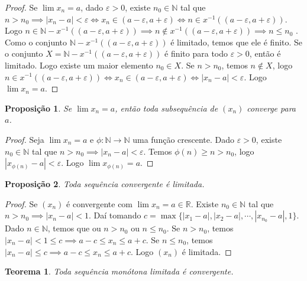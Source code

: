 \documentclass{article}
\newtheorem{prop}{Proposição}[section]
\theoremstyle{theorem}
\newtheorem{teo}{Teorema}
\theoremstyle{lemma}
\theoremstyle{definition}
\theoremstyle{remark}
\begin{document}
\begin{proof}
	Se $\lim x_n = a$, dado $\varepsilon >0$, existe $n_0 \in \mathbb{N}$ tal que $n > n_0 \implies |x_n - a| < \varepsilon \iff x_n \in (a-\varepsilon, a+\varepsilon) \iff n \in x^{-1}((a-\varepsilon, a+\varepsilon))$. Logo $n \in \mathbb{N} - x^{-1}( (a-\varepsilon, a+\varepsilon)) \implies n \not \in x^{-1}( (a-\varepsilon, a+\varepsilon)) \implies n \leq n_0$ .  Como o conjunto $\mathbb{N} - x^{-1}( (a - \varepsilon, a+\varepsilon))$ é limitado, temos que ele é finito.
	Se o conjunto $ X = \mathbb{N} - x^{-1}( (a - \varepsilon, a+\varepsilon))$ é finito para todo $\varepsilon >0$, então é limitado.  Logo existe um maior elemento $n_0 \in  X$. Se $n > n_0$,  temos $n \not \in X$, logo $n \in x^{-1}((a-\varepsilon, a+\varepsilon)) \iff x_n \in (a-\varepsilon, a+\varepsilon) \iff |x_n -a| < \varepsilon$. Logo $\lim x_n = a$.
\end{proof}
\begin{prop}
	Se $\lim x_n = a$, então toda subsequência de $(x_n)$ converge para $a$.
\end{prop}
\begin{proof}
	Seja $\lim x_n = a$ e $\phi: \mathbb{N} \to \mathbb{N}$ uma função crescente. Dado $\varepsilon>0$, existe $n_0 \in \mathbb{N}$ tal que $n> n_0 \implies |x_n -a| < \varepsilon$. Temos $\phi(n) \geq  n > n_0$, logo $|x_{\phi(n)} -a| < \varepsilon$. Logo $\lim x_{\phi(n)}  = a$.
\end{proof}
\begin{prop}
	Toda sequência convergente é limitada.
\end{prop}
\begin{proof}
	Se $(x_n)$ é convergente com $\lim x_n = a\in\mathbb{R}$. Existe $n_0 \in \mathbb{N}$ tal que $n>n_0 \implies |x_n - a|<1$. Daí tomando $c = \max\{|x_1 - a|, |x_2-a|, \cdots, |x_{n_0} -a |, 1\}$. Dado $n\in \mathbb{N}$, temos que ou $n>n_0$ ou $n\leq n_0$. Se $n>n_0$, temos $|x_n -a| < 1 \leq c \implies a-c \leq x_n \leq a+c$. Se $n\leq n_0$, temos $|x_n-a| \leq c \implies a-c \leq x_n \leq a+c$. Logo $(x_n)$ é limitada.
\end{proof}
\begin{teo}
	Toda sequência monótona limitada é convergente.
\end{teo}
\end{document}
